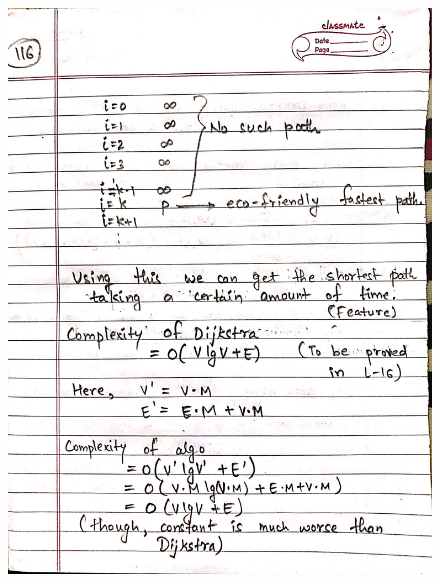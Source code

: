 \begin{figure}[H]
    \centering
    \includegraphics[width=16cm, height=21cm]{"./MIT-6.006/MIT-6006-116"}
\end{figure}
\newpage
